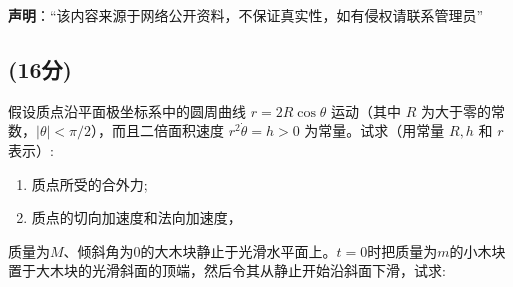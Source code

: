 
\textbf{声明}：“该内容来源于网络公开资料，不保证真实性，如有侵权请联系管理员”

\subsection{(16分)}
假设质点沿平面极坐标系中的圆周曲线 $r = 2R \cos \theta$ 运动（其中 $R$ 为大于零的常数，$\left| \theta \right| < \pi/2$），而且二倍面积速度 $r^2 \dot{\theta} = h > 0$ 为常量。试求（用常量 $R, h$ 和 $r$ 表示）:
\begin{enumerate}
\item 质点所受的合外力;
\item 质点的切向加速度和法向加速度，
\end{enumerate}

质量为$M$、倾斜角为0的大木块静止于光滑水平面上。$t=0$时把质量为$m$的小木块置于大木块的光滑斜面的顶端，然后令其从静止开始沿斜面下滑，试求: